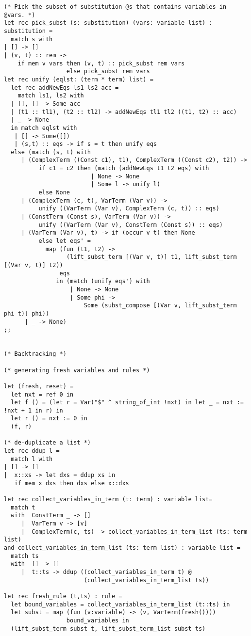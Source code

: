 \documentclass{article}
\begin{document}
\begin{verbatim}
(* Pick the subset of substitution @s that contains variables in @vars. *)
let rec pick_subst (s: substitution) (vars: variable list) : substitution =
  match s with
| [] -> []
| (v, t) :: rem -> 
    if mem v vars then (v, t) :: pick_subst rem vars
                  else pick_subst rem vars
let rec unify (eqlst: (term * term) list) =
  let rec addNewEqs ls1 ls2 acc =
    match ls1, ls2 with
  | [], [] -> Some acc
  | (t1 :: tl1), (t2 :: tl2) -> addNewEqs tl1 tl2 ((t1, t2) :: acc)
  | _ -> None
  in match eqlst with
   | [] -> Some([])
   | (s,t) :: eqs -> if s = t then unify eqs
  else (match (s, t) with 
     | (ComplexTerm ((Const c1), t1), ComplexTerm ((Const c2), t2)) ->
          if c1 = c2 then (match (addNewEqs t1 t2 eqs) with 
                         | None -> None 
                         | Some l -> unify l)
          else None
     | (ComplexTerm (c, t), VarTerm (Var v)) -> 
          unify ((VarTerm (Var v), ComplexTerm (c, t)) :: eqs)
     | (ConstTerm (Const s), VarTerm (Var v)) -> 
          unify ((VarTerm (Var v), ConstTerm (Const s)) :: eqs)
     | (VarTerm (Var v), t) -> if (occur v t) then None
          else let eqs' = 
            map (fun (t1, t2) -> 
                  (lift_subst_term [(Var v, t)] t1, lift_subst_term [(Var v, t)] t2))
                eqs
               in (match (unify eqs') with 
                   | None -> None 
                   | Some phi -> 
                       Some (subst_compose [(Var v, lift_subst_term phi t)] phi))
      | _ -> None)
;;


(* Backtracking *)

(* generating fresh variables and rules *)

let (fresh, reset) = 
  let nxt = ref 0 in
  let f () = (let r = Var("$" ^ string_of_int !nxt) in let _ = nxt := !nxt + 1 in r) in
  let r () = nxt := 0 in
  (f, r)

(* de-duplicate a list *)
let rec ddup l =
  match l with
| [] -> []
|  x::xs -> let dxs = ddup xs in
   if mem x dxs then dxs else x::dxs

let rec collect_variables_in_term (t: term) : variable list=
  match t
  with  ConstTerm _ -> []
     |  VarTerm v -> [v]
     |  ComplexTerm(c, ts) -> collect_variables_in_term_list (ts: term list)
and collect_variables_in_term_list (ts: term list) : variable list =
  match ts
  with  [] -> []
     |  t::ts -> ddup ((collect_variables_in_term t) @
                       (collect_variables_in_term_list ts))

let rec fresh_rule (t,ts) : rule =
  let bound_variables = collect_variables_in_term_list (t::ts) in
  let subst = map (fun (v:variable) -> (v, VarTerm(fresh()))) 
                  bound_variables in
  (lift_subst_term subst t, lift_subst_term_list subst ts)


\end{verbatim}
\end{document}
